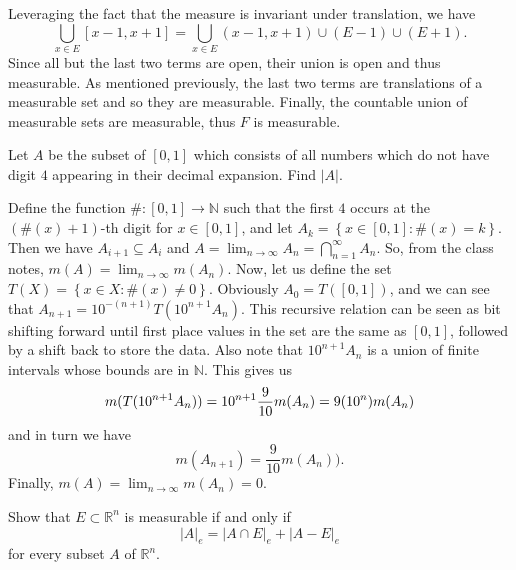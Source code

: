\begin{solution}
  Leveraging the fact that the measure is invariant under translation, we have
  \[
    \bigcup_{x \in E}[x-1,x+1] = \bigcup_{x \in E} (x-1,x+1) \cup (E - 1) \cup (E+1)
  .\] 
  Since all but the last two terms are open, their union is open and thus measurable.
  As mentioned previously, the last two terms are translations of a measurable set and so they are measurable.
  Finally, the countable union of measurable sets are measurable, thus $F$ is measurable.
\end{solution}

\begin{problem}{5}
Let $A$ be the subset of $\left[ 0,1 \right]$ which consists of all numbers which do not have digit $4$ appearing in their decimal expansion.
Find $\left| A \right|$.
\end{problem}

\begin{solution}
  Define the function $\# : [0,1] \to \mathbb{N} $ such that the first $4$ occurs at the $(\#(x)+1)$-th digit for $x \in [0,1]$, and let $A_{k} = \left\{ x\in[0,1] : \#(x) = k \right\}$.
  Then we have $A_{i+1} \subseteq A_{i}$ and $A = \lim_{n \to \infty} A_{n} = \bigcap_{n=1}^{ \infty } A_{n} $.
  So, from the class notes, $m(A) = \lim_{n \to \infty} m(A_{n})$.
  Now, let us define the set $T(X) = \left\{ x \in X : \#(x) \neq  0  \right\}$. 
  Obviously $A_{0} = T([0,1])$, and we can see that $A_{n+1} = 10^{-(n+1)}T(10^{n+1}A_{n})$.
  This recursive relation can be seen as bit shifting forward until first place values in the set are the same as $[0,1]$, followed by a shift back to store the data.
  Also note that $10^{n+1}A_{n}$ is a union of finite intervals whose bounds are in $\mathbb{N}$.
  This gives us
  \[
  m(T(10^{n+1}A_{n})) = 10^{n+1} \frac{9}{10} m(A_{n}) = 9(10^{n})m(A_{n}) \\
  \] 
  and in turn we have
  \[
  m(A_{n+1}) = \frac{9}{10}m(A_{n}))
  .\] 
  Finally, $m(A) = \lim_{n \to \infty} m(A_{n}) = 0$.

\end{solution}


\begin{problem}{6}
Show that $E \subset \mathbb{R}^{n}$ is measurable if and only if 
\[
\left| A \right|_{e } = \left| A \cap E  \right|_{e} + \left| A - E  \right|_{e}
\] 
for every subset $A$ of $\mathbb{R}^{n}$.
\end{problem}

\begin{solution}
\end{solution}

